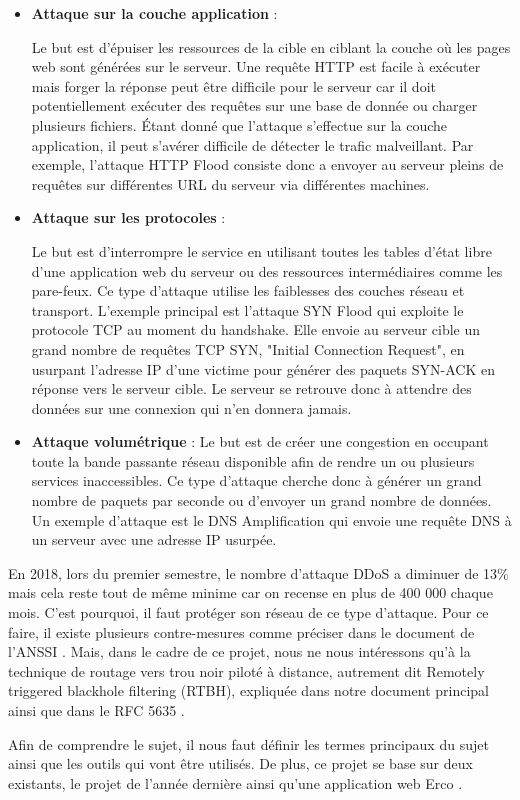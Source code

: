 \begin{itemize}
    \item \textbf{Attaque sur la couche application} : 
    
    Le but est d'épuiser les ressources de la cible en ciblant la couche où les pages web sont générées sur le serveur. Une requête HTTP est facile à exécuter mais forger la réponse peut être difficile pour le serveur car il doit potentiellement exécuter des requêtes sur une base de donnée ou charger plusieurs fichiers. Étant donné que l'attaque s'effectue sur la couche application, il peut s'avérer difficile de détecter le trafic malveillant. Par exemple, l'attaque HTTP Flood consiste donc a envoyer au serveur pleins de requêtes sur différentes URL du serveur via différentes machines.  
    
    \item \textbf{Attaque sur les protocoles} : 
    
    Le but est d'interrompre le service en utilisant toutes les tables d'état libre d'une application web du serveur ou des ressources intermédiaires comme les pare-feux. Ce type d'attaque utilise les faiblesses des couches réseau et transport. L'exemple principal est l'attaque SYN Flood qui exploite le protocole TCP au moment du handshake. Elle envoie au serveur cible un grand nombre de requêtes TCP SYN, "Initial Connection Request", en usurpant l'adresse IP d'une victime pour générer des paquets SYN-ACK en réponse vers le serveur cible. Le serveur se retrouve donc à attendre des données sur une connexion qui n'en donnera jamais.
    
    \item \textbf{Attaque volumétrique} : Le but est de créer une congestion en occupant toute la bande passante réseau disponible afin de rendre un ou plusieurs services inaccessibles. Ce type d'attaque cherche donc à générer un grand nombre de paquets par seconde ou d'envoyer un grand nombre de données. Un exemple d'attaque est le DNS Amplification qui envoie une requête DNS à un serveur avec une adresse IP usurpée.
\end{itemize}

En 2018, lors du premier semestre, le nombre d'attaque DDoS a diminuer de 13\% mais cela reste tout de même minime car on recense en plus de 400 000 chaque mois. C'est pourquoi, il faut protéger son réseau de ce type d'attaque. Pour ce faire, il existe plusieurs contre-mesures comme préciser dans le document de l'ANSSI \cite{Ans15}. Mais, dans le cadre de ce projet, nous ne nous intéressons qu'à la technique de routage vers trou noir piloté à distance, autrement dit Remotely triggered blackhole filtering (RTBH), expliquée dans notre document principal \cite{Sys05} ainsi que dans le RFC 5635 \cite{Rfcrtbh09}. 

Afin de comprendre le sujet, il nous faut définir les termes principaux du sujet ainsi que les outils qui vont être utilisés. De plus, ce projet se base sur deux existants, le projet de l'année dernière \cite{PMCB18} ainsi qu'une application web Erco \cite{Erc16}.